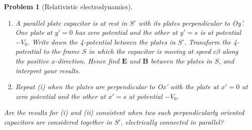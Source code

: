 \documentclass[a4paper]{article}
\theoremstyle{new}
\newtheorem{qns}{Problem}
\begin{document}
\begin{qns}[Relativistic electrodynamics]\leavevmode
\begin{enumerate}[label=(\roman*)]
\item A parallel plate capacitor is at rest in $S'$ with its plates perpendicular to Oy'. One
plate at $y'=0$ has zero potential and the other at $y'=s$ is at potential $−V_0$. Write down the 4-potential between the plates in $S'$. Transform the 4-potential to the frame $S$ in which the capacitor is moving at speed $c\beta$ along the positive $x$-direction. Hence find $\mathbf{E}$ and $\mathbf{B}$ between the plates in $S$, and interpret your results.
\item Repeat (i) when the plates are perpendicular to Ox' with the plate at $x'=0$ at zero potential and the other at $x'=s$ at potential $-V_0$.
\end{enumerate}
Are the results for (i) and (ii) consistent when two such perpendicularly oriented capacitors are considered together in $S'$, electrically connected in parallel?
\end{qns}
\end{document}
